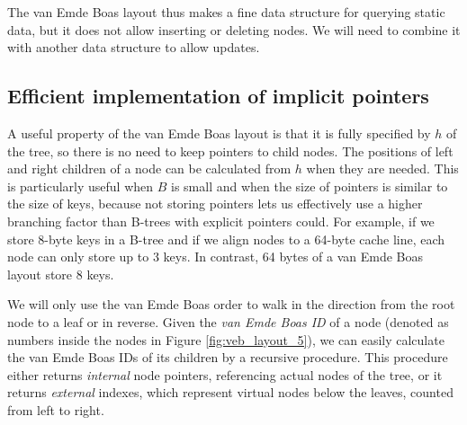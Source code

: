 The van Emde Boas layout thus makes a fine data structure for querying static
data, but it does not allow inserting or deleting nodes. We will need
to combine it with another data structure to allow updates.

\subsection{Efficient implementation of implicit pointers}
A useful property of the van Emde Boas layout is that it is fully specified
by $h$ of the tree, so there is no need to keep pointers to child nodes.
The positions of left and right children of a node can be calculated from
$h$ when they are needed.
This is particularly useful when $B$ is small and when the size of pointers
is similar to the size of keys, because not storing pointers lets us
effectively use a higher branching factor than B-trees with explicit
pointers could.
For example, if we store 8-byte keys in a B-tree and if we align nodes to
a 64-byte cache line, each node can only store up to 3 keys. In contrast,
64 bytes of a van Emde Boas layout store 8 keys.

We will only use the van Emde Boas order to walk in the direction from
the root node to a leaf or in reverse.
Given the \emph{van Emde Boas ID} of a node (denoted as numbers
inside the nodes in Figure \ref{fig:veb_layout_5}),
we can easily calculate the van Emde Boas IDs of its children by
a recursive procedure. This procedure either returns \emph{internal} node
pointers, referencing actual nodes of the tree, or it returns \emph{external}
indexes, which represent virtual nodes below the leaves, counted from left
to right.

